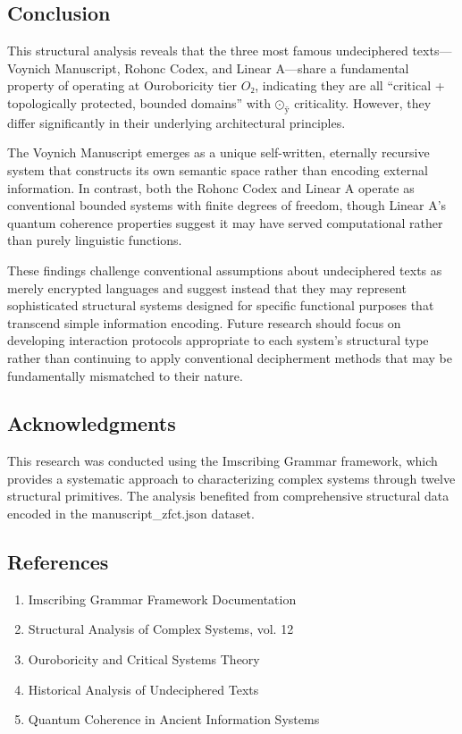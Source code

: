 \documentclass[12pt,a4paper]{article}
\begin{document}
\subsection{Conclusion}

This structural analysis reveals that the three most famous undeciphered texts---Voynich Manuscript, Rohonc Codex, and Linear A---share a fundamental property of operating at Ouroboricity tier $O₂$, indicating they are all ``critical + topologically protected, bounded domains'' with $\text{⊙}_{\text{ÿ}}$ criticality. However, they differ significantly in their underlying architectural principles.

The Voynich Manuscript emerges as a unique self-written, eternally recursive system that constructs its own semantic space rather than encoding external information. In contrast, both the Rohonc Codex and Linear A operate as conventional bounded systems with finite degrees of freedom, though Linear A's quantum coherence properties suggest it may have served computational rather than purely linguistic functions.

These findings challenge conventional assumptions about undeciphered texts as merely encrypted languages and suggest instead that they may represent sophisticated structural systems designed for specific functional purposes that transcend simple information encoding. Future research should focus on developing interaction protocols appropriate to each system's structural type rather than continuing to apply conventional decipherment methods that may be fundamentally mismatched to their nature.

\subsection{Acknowledgments}

This research was conducted using the Imscribing Grammar framework, which provides a systematic approach to characterizing complex systems through twelve structural primitives. The analysis benefited from comprehensive structural data encoded in the manuscript\_zfct.json dataset.

\subsection{References}

\begin{enumerate}
    \item Imscribing Grammar Framework Documentation
    \item Structural Analysis of Complex Systems, vol. 12
    \item Ouroboricity and Critical Systems Theory
    \item Historical Analysis of Undeciphered Texts
    \item Quantum Coherence in Ancient Information Systems
\end{enumerate}
\end{document}
